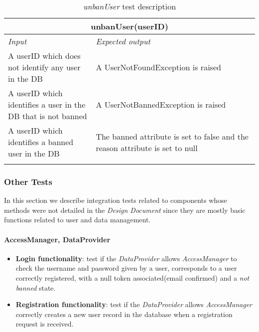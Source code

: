 \begin{longtable}{p{0.35\linewidth}p{0.65\linewidth}}
\multicolumn{2}{c}{\textbf{unbanUser(userID)}} \\
\toprule
\emph{Input} & \emph{Expected output} \\
\midrule
A userID which does not identify any user in the DB & A UserNotFoundException is raised\\
\midrule
A userID which identifies a user in the DB that is not banned & A UserNotBannedException is raised\\
\midrule
A userID which identifies a banned user in the DB & The banned attribute is set to false and the reason attribute is set to null \\
\bottomrule
\caption{\emph{unbanUser} test description}
\end{longtable}


\subsubsection{Other Tests}
In this section we describe integration tests related to components whose methods were not detailed in the \emph{Design Document} \cite{DD} since they are mostly basic functions related to user and data management.

\paragraph{AccessManager, DataProvider} 
\begin{itemize}
\item \textbf{Login functionality}: test if the \emph{DataProvider} allows \emph{AccessManager} to check the username and password given by a user,  corresponds to a user correctly registered, with a null token associated(email confirmed) and a \emph{not banned} state.
\item \textbf{Registration functionality}: test if the \emph{DataProvider} allows \emph{AccessManager} correctly creates a new user record in the database when a registration request is received.
\end{itemize}

